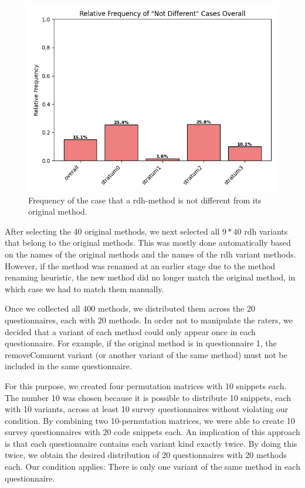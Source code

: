 \documentclass[%
class=scrreprt,
chapterprefix=false,%
open=right,%
twoside=false,%
paper=a4,%
logofile={Logo\_zentral\_farbig\_EN.png},%
thesistype=master,%
UKenglish,%
]{se2thesis}
\theoremstyle{definition}
\begin{document}
	\begin{figure}[tb]
		\centering
		\includegraphics[width=\textwidth]{img/sampling_not_different_overall.png}
		\caption{Frequency of the case that a rdh-method is not different from its original method.} 
		\label{fig:sampling_not_different_overall}
	\end{figure}
		
	After selecting the 40 original methods, we next selected all $9*40$ rdh variants that belong to the original methods. This was mostly done automatically based on the names of the original methods and the names of the rdh variant methods. However, if the method was renamed at an earlier stage due to the method renaming heuristic, the new method did no longer match the original method, in which case we had to match them manually.
		
	Once we collected all 400 methods, we distributed them across the 20 questionnaires, each with 20 methods. In order not to manipulate the raters, we decided that a variant of each method could only appear once in each questionnaire. For example, if the original method is in questionnaire 1, the removeComment variant (or another variant of the same method) must not be included in the same questionnaire.
		
	For this purpose, we created four permutation matrices with 10 snippets each. The number 10 was chosen because it is possible to distribute 10 snippets, each with 10 variants, across at least 10 survey questionnaires without violating our condition. By combining two 10-permutation matrices, we were able to create 10 survey questionnaires with 20 code snippets each. An implication of this approach is that each questionnaire contains each variant kind exactly twice. By doing this twice, we obtain the desired distribution of 20 questionnaires with 20 methods each. Our condition applies: There is only one variant of the same method in each questionnaire.
		
\end{document}
